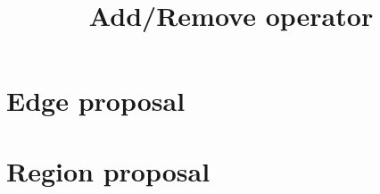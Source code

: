\documentclass[a4paper,11pt]{article}
\title{Add/Remove operator}
\begin{document}
\maketitle

\section{Edge proposal}



\section{Region proposal}
\end{document}
